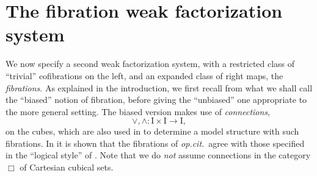 \documentclass[11pt]{amsart}
\newcommand{\opcit}{\emph{op.cit.}}
\newcommand{\ra}{\ensuremath{\rightarrow}}
\newcommand{\too}{\ensuremath{\longrightarrow}}
\newcommand{\I}{\ensuremath{\mathrm{I}}}
\theoremstyle{remark}
\theoremstyle{definition}
\begin{document}
%

\section{The fibration weak factorization system}\label{sec:fibrations}

We now specify a second weak factorization system, with a restricted class of ``trivial'' cofibrations on the left, and an expanded class of right maps, the \emph{fibrations}.  As explained in the introduction, we first recall from \cite{GS} what we shall call the ``biased'' notion of fibration, before giving the ``unbiased'' one appropriate to the more general setting.   The biased version makes use of \emph{connections}, $$\vee,\wedge : \I\times\I \too \I,$$ on the cubes, which are also used in \cite{Sattler} to determine a model structure with such fibrations.  In \cite{AGH} it is shown that the fibrations of \opcit\ agree with those specified in the ``logical style'' of \cite{CCHM,OP}.    Note that we do \emph{not} assume connections in the category $\Box$ of Cartesian cubical sets.
\end{document}
